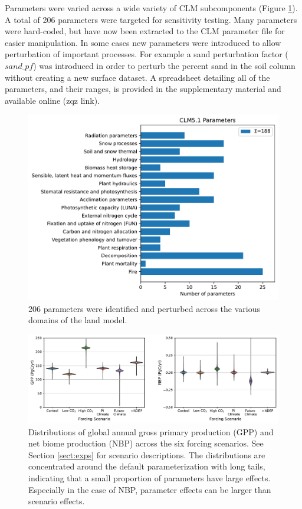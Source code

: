 \documentclass[draft]{agujournal2019}
\begin{document}
Parameters were varied across a wide variety of CLM subcomponents (Figure \ref{fig:params}). A total of 206 parameters were targeted for sensitivity testing. Many parameters were hard-coded, but have now been extracted to the CLM parameter file for easier manipulation. In some cases new parameters were introduced to allow perturbation of important processes. For example a sand perturbation factor ($sand\_pf$) was introduced in order to perturb the percent sand in the soil column without creating a new surface dataset. A spreadsheet detailing all of the parameters, and their ranges, is provided in the supplementary material and available online (zqz link).

\begin{figure}[h]
\centering
\includegraphics[width=30pc]{../figs/bar.pdf}
\caption{206 parameters were identified and perturbed across the various domains of the land model.}
\label{fig:params}
\end{figure}


\begin{figure}[h]
\centering
\includegraphics[width=35pc]{../figs/violins.pdf}
\caption{Distributions of global annual gross primary production (GPP) and net biome production (NBP) across the six forcing scenarios. See Section \ref{sect:exps} for scenario descriptions. The distributions are concentrated around the default parameterization with long tails, indicating that a small proportion of parameters have large effects. Especially in the case of NBP, parameter effects can be larger than scenario effects.}
\label{}
\end{figure}
\end{document}
